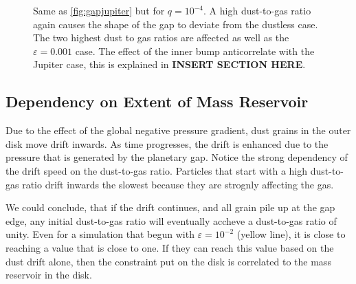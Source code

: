 \documentclass[onecolumn]{report}
\begin{document}
\begin{figure}
  \begin{center}
  \end{center}
  \caption{Same as \ref{fig:gapjupiter} but for $q=10^{-4}$. A high dust-to-gas ratio again causes the shape of the gap to deviate from the dustless case. The two highest dust to gas ratios are affected as well as the $\varepsilon=0.001$ case. The effect of the inner bump anticorrelate with the Jupiter case, this is explained in \textbf{INSERT SECTION HERE}.}
  \label{fig:gapneptune}
\end{figure}


\subsection{Dependency on Extent of Mass Reservoir}

Due to the effect of the global negative pressure gradient, dust grains in the outer disk move drift inwards. As time progresses, the drift is enhanced due to the pressure that is generated by the planetary gap. Notice the strong dependency of the drift speed on the dust-to-gas ratio. Particles that start with a high dust-to-gas ratio drift inwards the slowest because they are strognly affecting the gas.\par

We could conclude, that if the drift continues, and all grain pile up at the gap edge, any initial dust-to-gas ratio will eventually accheve a dust-to-gas ratio of unity. Even for a simulation that begun with $\varepsilon=10^{-2}$ (yellow line), it is close to reaching a value that is close to one. If they can reach this value based on the dust drift alone, then the constraint put on the disk is correlated to the mass reservoir in the disk. 
\end{document}
